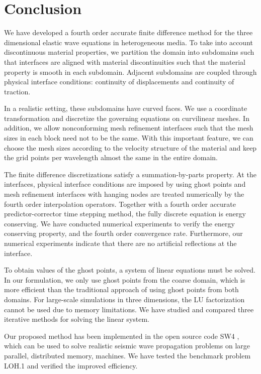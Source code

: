 \section{Conclusion}
We have developed a fourth order accurate finite difference method for the three dimensional elastic wave equations in heterogeneous media. To take into account discontinuous material properties, we partition the domain into subdomains such that interfaces are aligned with material discontinuities such that the material property is smooth in each subdomain. Adjacent subdomains are coupled through physical interface conditions: continuity of displacements and continuity of traction.

In a realistic setting, these subdomains have curved faces. We use a coordinate transformation and discretize the governing equations on curvilinear meshes. In addition, we allow nonconforming mesh refinement interfaces such that the mesh sizes in each block need not to be the same. With this important feature, we can choose the mesh sizes according to the velocity structure of the material and keep the grid points per wavelength almost the same in the entire domain. 

The finite difference discretizations satisfy a summation-by-parts property. At the interfaces, physical interface conditions are imposed by using ghost points and mesh refinement interfaces with hanging nodes are treated numerically by the fourth order interpolation operators. Together with a fourth order accurate predictor-corrector time stepping method, the fully discrete equation is energy conserving. We have conducted numerical experiments to verify the energy conserving property, and the fourth order convergence rate. Furthermore, our numerical experiments indicate that there are no artificial reflections at the interface.

To obtain values of the ghost points, a system of linear equations must be solved. In our formulation, we only use ghost points from the coarse domain, which is more efficient than the traditional approach of using ghost points from both domains.  For large-scale simulations in three dimensions, the LU factorization cannot be used due to memory limitations. We have studied and compared three iterative methods for solving the linear system.

Our proposed method has been implemented in the open source code SW4 \cite{SW4}, which can be used to solve realistic seismic wave propagation problems on large parallel, distributed memory, machines. We have tested the benchmark problem LOH.1 and verified the improved efficiency. 